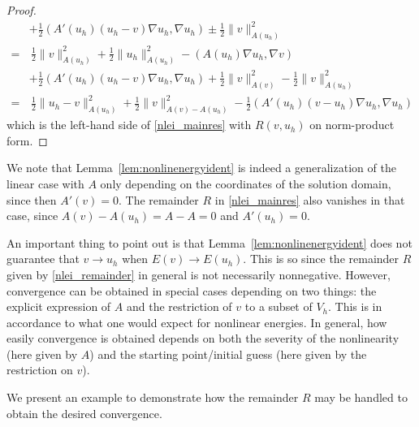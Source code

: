\documentclass[12pt]{article}
\begin{document}
\begin{lem}
\begin{proof}
\begin{equation}
\begin{aligned}
			& + \frac{1}{2}(A'(u_h) (u_h - v) \nabla u_h, \nabla u_h) \pm \frac{1}{2}\| v \|_{A(u_h)}^2 \\
			= & \, \frac{1}{2}\| v \|_{A(u_h)}^2 + \frac{1}{2}\| u_h \|_{A(u_h)}^2 - (A(u_h) \nabla u_h, \nabla v) \\
			& + \frac{1}{2}(A'(u_h) (u_h - v) \nabla u_h, \nabla u_h) + \frac{1}{2}\| v \|_{A(v)}^2 - \frac{1}{2}\| v \|_{A(u_h)}^2 \\
			= & \, \frac{1}{2}\| u_h - v \|_{A(u_h)}^2 + \frac{1}{2}\| v \|_{A(v) - A(u_h)}^2 - \frac{1}{2}(A'(u_h) (v - u_h) \nabla u_h, \nabla u_h)
		\end{aligned}
		\end{equation}
		which is the left-hand side of \eqref{nlei_mainres} with $R(v, u_h)$ on norm-product form.
	\end{proof}
\end{lem}

We note that Lemma~\ref{lem:nonlinenergyident} is indeed a generalization of the linear case with $A$ only depending on the coordinates of the solution domain, since then $A'(v) = 0$. The remainder $R$ in \eqref{nlei_mainres} also vanishes in that case, since $A(v) - A(u_h) = A - A = 0$ and $A'(u_h) = 0$.

\begin{rem}
An important thing to point out is that Lemma~\ref{lem:nonlinenergyident} does not guarantee that $v \rightarrow u_h$ when $E(v) \rightarrow E(u_h)$. This is so since the remainder $R$ given by \eqref{nlei_remainder} in general is not necessarily nonnegative. However, convergence can be obtained in special cases depending on two things: the explicit expression of $A$ and the restriction of $v$ to a subset of $V_h$. This is in accordance to what one would expect for nonlinear energies. In general, how easily convergence is obtained depends on both the severity of the nonlinearity (here given by $A$) and the starting point/initial guess (here given by the restriction on $v$).
\end{rem}

We present an example to demonstrate how the remainder $R$ may be handled to obtain the desired convergence.
\end{document}
